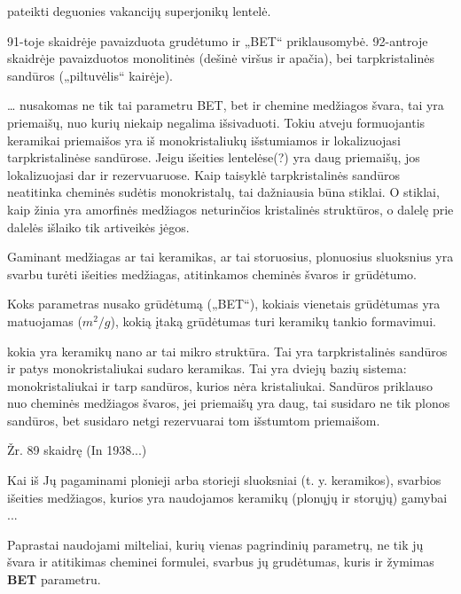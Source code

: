  pateikti deguonies vakancijų superjonikų lentelė.

91-toje skaidrėje pavaizduota grudėtumo ir „BET“ priklausomybė.
92-antroje skaidrėje pavaizduotos monolitinės (dešinė viršus ir
apačia), bei tarpkristalinės sandūros („piltuvėlis“ kairėje).

… nusakomas ne tik tai parametru BET, bet ir chemine medžiagos švara,
tai yra priemaišų, nuo kurių niekaip negalima išsivaduoti. Tokiu
atveju formuojantis keramikai priemaišos yra iš monokristaliukų 
išstumiamos ir lokalizuojasi tarpkristalinėse sandūrose.
Jeigu išeities lentelėse(?)
yra daug priemaišų, jos lokalizuojasi dar ir rezervuaruose.
Kaip taisyklė tarpkristalinės sandūros neatitinka cheminės sudėtis
monokristalų, tai dažniausia būna stiklai. O stiklai, kaip
žinia yra amorfinės medžiagos neturinčios kristalinės struktūros,
o dalelę prie dalelės išlaiko tik artiveikės jėgos.

\begin{remember}
  \item Gaminant medžiagas ar tai keramikas, ar tai storuosius,
    plonuosius sluoksnius yra svarbu turėti išeities medžiagas,
    atitinkamos cheminės švaros ir grūdėtumo.
  \item
    \item Koks parametras nusako grūdėtumą („BET“),
    kokiais vienetais grūdėtumas yra matuojamas ($m^2/g$),
    kokią įtaką grūdėtumas turi keramikų tankio formavimui.
    \item kokia yra
    keramikų nano ar tai mikro struktūra. Tai yra tarpkristalinės
    sandūros ir patys monokristaliukai sudaro keramikas. Tai yra
    dviejų bazių sistema: monokristaliukai ir tarp 
    sandūros, kurios nėra kristaliukai. Sandūros priklauso nuo
    cheminės medžiagos švaros, jei priemaišų yra daug, tai susidaro
    ne tik plonos sandūros, bet susidaro netgi rezervuarai tom
    išstumtom priemaišom.
\end{remember}

Žr. 89 skaidrę (In 1938...)

Kai iš Jų pagaminami plonieji arba storieji sluoksniai (t. y. keramikos),
svarbios išeities medžiagos, kurios yra naudojamos keramikų (plonųjų ir
storųjų) gamybai ...

Paprastai naudojami milteliai, kurių vienas pagrindinių parametrų,
ne tik jų švara ir atitikimas cheminei formulei,
svarbus jų grudėtumas, kuris ir žymimas \textbf{BET} parametru.

